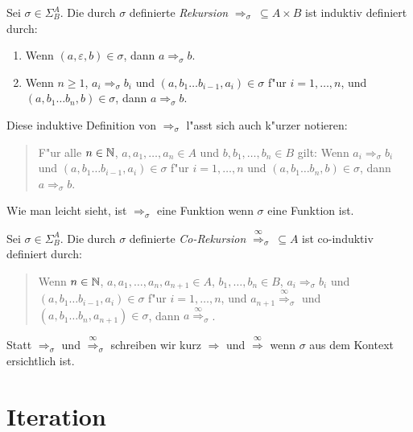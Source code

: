 \documentclass[12pt,a4paper]{article}
\begin{document}
\begin{definition}[Rekursion]
  Sei $\sigma \in \Sigma^A_B$. Die durch $\sigma$ definierte \emph{Rekursion}
  $\Rightarrow_\sigma\ \subseteq A \times B$ ist induktiv definiert durch:
  \begin{enumerate}
  \item Wenn $(a,\varepsilon, b) \in \sigma$, dann $a \Rightarrow_\sigma b$.
  \item Wenn $n \ge 1$, $a_i \Rightarrow_\sigma b_i$ und $(a,b_1 \ldots b_{i-1},a_i) \in \sigma$ f"ur $i=1,\ldots,n$,
    und $(a,b_1 \ldots b_n,b)\in\sigma$, dann $a \Rightarrow_\sigma b$.
  \end{enumerate}
\end{definition}
Diese induktive Definition von $\Rightarrow_\sigma$ l"asst sich auch k"urzer notieren:
\begin{quote}
  F"ur alle $n \in \mathbb N$, $a, a_1,\ldots,a_n \in A$ und $b,b_1,\ldots,b_n\in B$ gilt: 
  Wenn $a_i \Rightarrow_\sigma b_i$ und $(a,b_1 \ldots b_{i-1},a_i)\in\sigma$ f"ur $i = 1,\ldots,n$ und
  $(a,b_1 \ldots b_n,b)\in\sigma$, dann $a \Rightarrow_\sigma b$.
\end{quote}
Wie man leicht sieht, ist $\Rightarrow_\sigma$ eine Funktion wenn $\sigma$ eine Funktion ist.

\begin{definition}[Co-Rekursion]
  Sei $\sigma \in \Sigma^A_B$. Die durch $\sigma$ definierte \emph{Co-Rekursion}
  $\stackrel{\infty}{\Rightarrow}_\sigma\ \subseteq A$ ist co-induktiv definiert durch:
  \begin{quote}
    Wenn $n \in \mathbb N$, $a, a_1,\ldots,a_n,a_{n+1} \in A$, $b_1,\ldots,b_n\in B$,
    $a_i \Rightarrow_\sigma b_i$ und $(a,b_1 \ldots b_{i-1},a_i)\in\sigma$ f"ur $i=1,\ldots,n$,
    und $a_{n+1} \stackrel{\infty}{\Rightarrow}_\sigma$ und $(a,b_1 \ldots b_n,a_{n+1})\in\sigma$,
    dann $a \stackrel{\infty}{\Rightarrow}_\sigma$.
  \end{quote}
\end{definition}
Statt $\Rightarrow_\sigma$ und $\stackrel{\infty}{\Rightarrow}_\sigma$ schreiben wir kurz $\Rightarrow$
und $\stackrel{\infty}{\Rightarrow}$ wenn $\sigma$ aus dem Kontext ersichtlich ist.


\section{Iteration}
\end{document}
